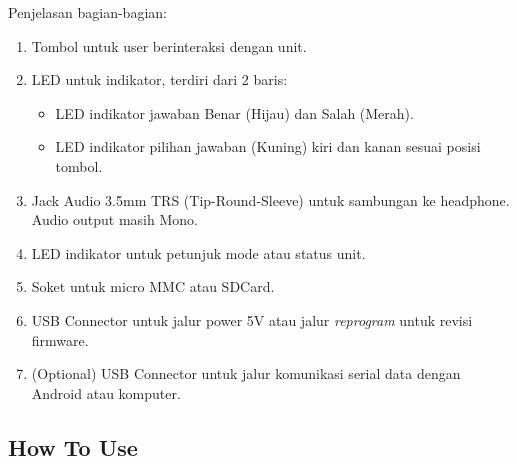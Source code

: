 \documentclass[12pt,]{article}
\begin{document}
	Penjelasan bagian-bagian:
	\begin{enumerate}
		\item Tombol untuk user berinteraksi dengan unit.
		
		\item LED untuk indikator, terdiri dari 2 baris:
		\begin{itemize}
			\item LED indikator jawaban Benar (Hijau) dan Salah (Merah).
			\item LED indikator pilihan jawaban (Kuning) kiri dan kanan sesuai posisi tombol.
		\end{itemize}
	
		\item Jack Audio 3.5mm TRS (Tip-Round-Sleeve) untuk sambungan ke headphone.
		Audio output masih Mono.
		
		\item LED indikator untuk petunjuk mode atau status unit.
		
		\item Soket untuk micro MMC atau SDCard.
		
		\item USB Connector untuk jalur power 5V atau jalur \textit{reprogram} untuk revisi firmware.
		
		\item (Optional) USB Connector untuk jalur komunikasi serial data dengan Android atau komputer.
 
	\end{enumerate}

	\newpage
	\subsection{How To Use}
	
\end{document}
